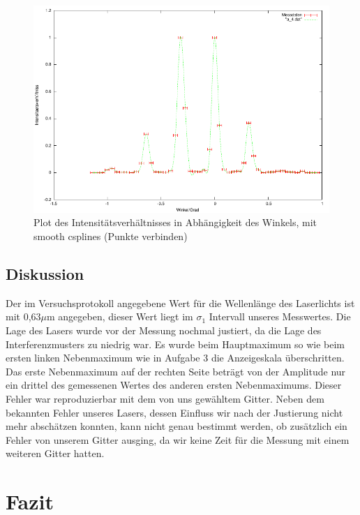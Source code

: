 \documentclass[12pt]{scrartcl}
\begin{document}
\begin{figure}[H]
\centering
    \includegraphics[scale = 1]{a_4.pdf}
  	\caption[Plot des Intensitätsverhältnisses in Abhängigkeit des Winkels, mit smooth csplines (Punkte verbinden)]{Plot des Intensitätsverhältnisses in Abhängigkeit des Winkels, mit smooth csplines (Punkte verbinden)}
  \label{fig:a_4}
\end{figure}


\subsection{Diskussion}
Der im Versuchsprotokoll angegebene Wert für die Wellenlänge des Laserlichts ist mit 0,63$\mu$m angegeben, dieser Wert liegt im $\sigma_1$ Intervall unseres Messwertes. Die Lage des Lasers wurde vor der Messung nochmal justiert, da die Lage des Interferenzmusters zu niedrig war. Es wurde beim Hauptmaximum so wie beim ersten linken Nebenmaximum wie in Aufgabe 3 die Anzeigeskala überschritten. Das erste Nebenmaximum auf der rechten Seite beträgt von der Amplitude nur ein drittel des gemessenen Wertes des anderen ersten Nebenmaximums. Dieser Fehler war reproduzierbar mit dem von uns gewähltem Gitter. Neben dem bekannten Fehler unseres Lasers, dessen Einfluss wir nach der Justierung nicht mehr abschätzen konnten, kann nicht genau bestimmt werden, ob zusätzlich ein Fehler von unserem Gitter ausging, da wir keine Zeit für die Messung mit einem weiteren Gitter hatten.

\section{Fazit}
\end{document}
